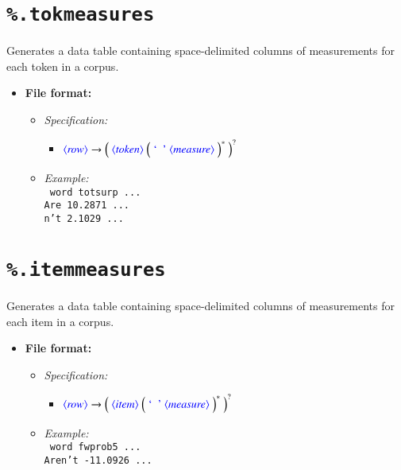 \documentclass[12pt]{report}
\def\blue{\color{blue}}
\def\magenta{\color{magenta}}
\begin{document}
\section{{\blue\tt \%.tokmeasures}}

Generates a data table containing space-delimited columns of measurements for each token in a corpus.

\begin{itemize}
      \item \textbf{File format:}
      \begin{itemize}
            \item \textit{Specification:}\\
                  \begin{itemize}
                  \item $\dtype{row} \rightarrow \Big( \ \dtype{token} \ \Big( \ \dcode{\ } \ \dtype{measure} \ \Big)^* \ \Big)^?$
                  \end{itemize}
            \item \textit{Example:}\\
                  {\magenta\tt
                  word totsurp ...\\
                  Are 10.2871 ...\\
                  n't 2.1029 ...
                  }
      \end{itemize}
\end{itemize}


\section{{\blue\tt \%.itemmeasures}}

Generates a data table containing space-delimited columns of measurements for each item in a corpus.

\begin{itemize}
      \item \textbf{File format:}
      \begin{itemize}
            \item \textit{Specification:}\\
                  \begin{itemize}
                  \item $\dtype{row} \rightarrow \Big( \ \dtype{item} \ \Big( \ \dcode{\ } \ \dtype{measure} \ \Big)^* \ \Big)^?$
                  \end{itemize}
            \item \textit{Example:}\\
                  {\magenta\tt
                  word fwprob5 ...\\
                  Aren't -11.0926 ...\\
                  }
      \end{itemize}
\end{itemize}
\end{document}
